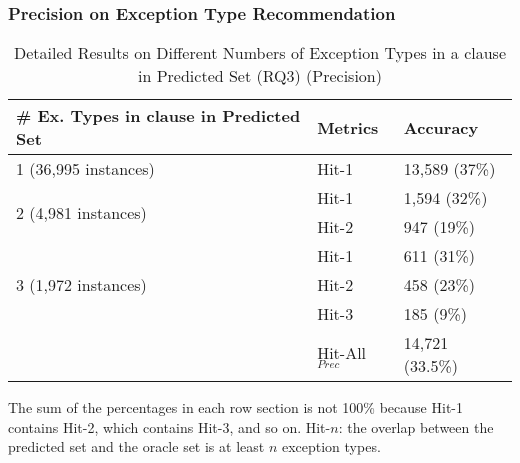 
\subsubsection{{\bf Precision on Exception Type Recommendation}}
\label{sec:req3-precision}


\begin{table}[t]
  \caption{Detailed Results on Different Numbers of Exception Types in a  clause in Predicted Set (RQ3) (Precision)}
	\vspace{-12pt}
	{\small
	  \begin{center}
            \tabcolsep 2pt
			\renewcommand{\arraystretch}{1}
			\begin{tabular}{p{5cm}<{\centering}|p{1.4cm}<{\centering}|p{1.6cm}<{\centering}}
				\hline
				\# Ex. Types in \code{catch} clause in Predicted Set & Metrics & Accuracy \\
				\hline
				\multirow{1}{*}{1 (36,995 instances)}   & Hit-1  & 13,589 (37\%) \\
				\hline
				\multirow{2}{*}{2 (4,981 instances)}  & Hit-1   & 1,594 (32\%) \\
				& Hit-2       						& 947 (19\%) \\
				\hline
				\multirow{3}{*}{3 (1,972 instances)}  & Hit-1    & 611 (31\%) \\
				& Hit-2         					& 458 (23\%)\\
				& Hit-3         				  	& 185 (9\%) \\
                                \hline
                                & Hit-All$_{Prec}$ & 14,721 (33.5\%)\\
				\hline
			\end{tabular}
                        The sum of the percentages in each row section is not 100\% because Hit-1 contains Hit-2, which contains Hit-3, and so on. Hit-$n$: the overlap between the predicted set and the oracle set is at least $n$ exception types.
			\label{tab:precision-3}
		\end{center}
	}
\end{table}

